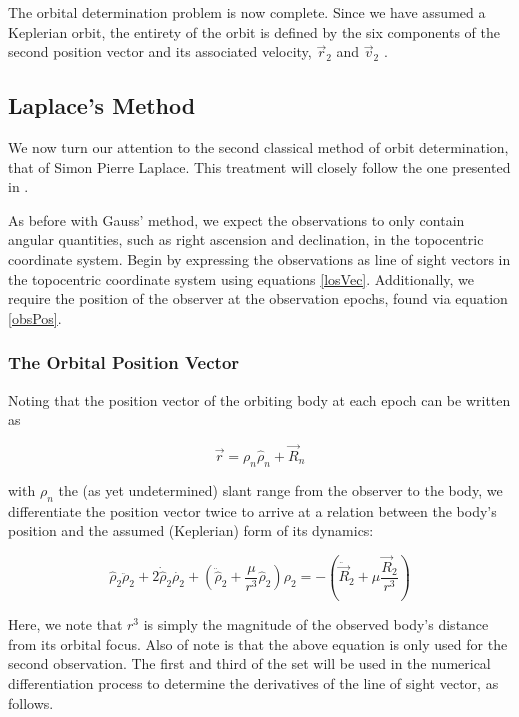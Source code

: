 \documentclass[11pt,twoside,letterpaper]{article}
\begin{document}
  The orbital determination problem is now complete. Since we have
  assumed a Keplerian orbit, the entirety of the orbit is defined by
  the six components of the second position vector and its associated
  velocity, $\vec{r}_2$ and $\vec{v}_2$ \cite{kluever_2018}.

  \subsection{Laplace's Method}
  We now turn our attention to the second classical method of orbit
  determination, that of Simon Pierre Laplace. This treatment will
  closely follow the one presented in \cite{bate_mueller_white_2015}.

  As before with Gauss' method, we expect the observations to only
  contain angular quantities, such as right ascension and declination,
  in the topocentric coordinate system. Begin by expressing the
  observations as line of sight vectors in the topocentric coordinate
  system using equations \ref{losVec}. Additionally, we require the
  position of the observer at the observation epochs, found via
  equation \ref{obsPos}.

  \subsubsection{The Orbital Position Vector}
  Noting that the position vector of the orbiting body at each epoch
  can be written as

  \begin{equation} \label{focalPos}
    \vec{r} = \rho_n\hat{\rho}_n + \vec{R}_n
  \end{equation}

  with $\rho_n$ the (as yet undetermined) slant range from the observer
  to the body, we differentiate the position vector twice to arrive at
  a relation between the body's position and the assumed
  (Keplerian) form of its dynamics:

  \begin{equation} \label{posDiff}
    \hat{\rho}_2\ddot{\rho}_2 + 2\dot{\hat{\rho}}_2\dot{\rho_2}
    + \left( \ddot{\hat{\rho}}_2 + \frac{\mu}{r^3}\hat{\rho}_2 \right)\rho_2
    = -\left( \ddot{\vec{R}}_2 + \mu\frac{\vec{R}_2}{r^3} \right)
  \end{equation}

  Here, we note that $r^3$ is simply the magnitude of the observed
  body's distance from its orbital focus. Also of note is that the
  above equation is only used for the second observation. The first
  and third of the set will be used in the numerical differentiation
  process to determine the derivatives of the line of sight vector, as
  follows.
\end{document}
